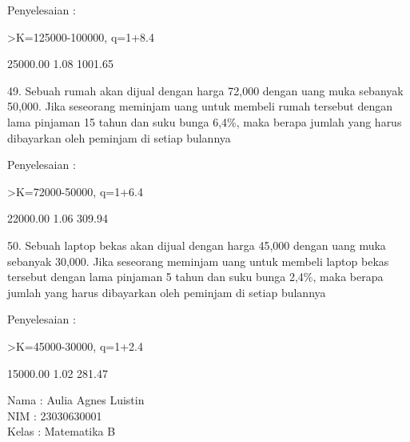 \documentclass[a4paper,10pt]{article}
\begin{document}
\begin{eulernotebook}
\begin{eulercomment}
\begin{eulercomment}
\begin{eulercomment}
\begin{eulercomment}
\begin{eulercomment}
\begin{eulercomment}
\begin{eulercomment}
\begin{eulercomment}
\begin{eulercomment}
Penyelesaian :
\end{eulercomment}
\begin{eulerprompt}
>K=125000-100000, q=1+8.4%
\end{eulerprompt}
\begin{euleroutput}
     25000.00 
         1.08 
      1001.65 
\end{euleroutput}
\begin{eulercomment}
49.  Sebuah rumah akan dijual dengan harga \textdollar{}72,000 dengan uang muka
sebanyak \textdollar{}50,000. Jika seseorang meminjam uang untuk membeli rumah
tersebut dengan lama pinjaman 15 tahun dan suku bunga 6,4\%, maka
berapa jumlah yang harus dibayarkan oleh peminjam di setiap bulannya

Penyelesaian :
\end{eulercomment}
\begin{eulerprompt}
>K=72000-50000, q=1+6.4%
\end{eulerprompt}
\begin{euleroutput}
     22000.00 
         1.06 
       309.94 
\end{euleroutput}
\begin{eulercomment}
50.  Sebuah laptop bekas akan dijual dengan harga \textdollar{}45,000 dengan uang
muka sebanyak \textdollar{}30,000. Jika seseorang meminjam uang untuk membeli
laptop bekas tersebut dengan lama pinjaman 5 tahun dan suku bunga
2,4\%, maka berapa jumlah yang harus dibayarkan oleh peminjam di setiap
bulannya

Penyelesaian :
\end{eulercomment}
\begin{eulerprompt}
>K=45000-30000, q=1+2.4%
\end{eulerprompt}
\begin{euleroutput}
     15000.00 
         1.02 
       281.47 
\end{euleroutput}
\begin{eulercomment}
Nama : Aulia Agnes Luistin\\
NIM : 23030630001\\
Kelas : Matematika B





\end{eulercomment}
\end{eulercomment}
\end{eulercomment}
\end{eulercomment}
\end{eulercomment}
\end{eulercomment}
\end{eulercomment}
\end{eulercomment}
\end{eulercomment}
\end{eulernotebook}
\end{document}
